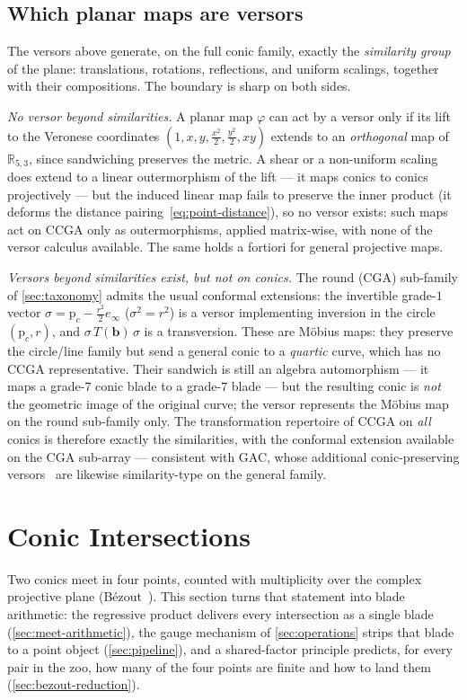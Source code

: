 \documentclass{birkjour}
\theoremstyle{definition}
\theoremstyle{remark}
\newcommand{\einf}{e_\infty}
\begin{document}
\subsection{Which planar maps are versors}
\label{sec:versor-group}
The versors above generate, on the full conic family, exactly the
\emph{similarity group} of the plane: translations, rotations, reflections,
and uniform scalings, together with their compositions. The boundary is
sharp on both sides.

\emph{No versor beyond similarities.} A planar map $\varphi$ can act by a
versor only if its lift to the Veronese coordinates
$(1,x,y,\tfrac{x^2}2,\tfrac{y^2}2,xy)$ extends to an \emph{orthogonal} map of
$\mathbb{R}_{5,3}$, since sandwiching preserves the metric. A shear or a
non-uniform scaling does extend to a linear outermorphism of the lift --- it
maps conics to conics projectively --- but the induced linear map fails to
preserve the inner product (it deforms the distance
pairing~\eqref{eq:point-distance}), so no versor exists: such maps act on
CCGA only as outermorphisms, applied matrix-wise, with none of the versor
calculus available. The same holds a fortiori for general projective maps.

\emph{Versors beyond similarities exist, but not on conics.} The round
(CGA) sub-family of \cref{sec:taxonomy} admits the usual conformal
extensions: the invertible grade-$1$ vector
$\sigma = \mathrm{p}_c - \tfrac{r^2}{2}\einf$ ($\sigma^2=r^2$) is a versor
implementing inversion in the circle $(\mathrm{p}_c, r)$, and
$\sigma\,T(\mathbf{b})\,\sigma$ is a transversion. These are M\"obius maps:
they preserve the circle/line family but send a general conic to a
\emph{quartic} curve, which has no CCGA representative. Their sandwich is
still an algebra automorphism --- it maps a grade-$7$ conic blade to a
grade-$7$ blade --- but the resulting conic is \emph{not} the geometric image
of the original curve; the versor represents the M\"obius map on the round
sub-family only. The transformation repertoire of CCGA on \emph{all} conics
is therefore exactly the similarities, with the conformal extension available
on the CGA sub-array --- consistent with GAC, whose additional
conic-preserving versors~\cite{hrdina_geometric_2018} are likewise
similarity-type on the general family.

\section{Conic Intersections}
\label{sec:intersections}
Two conics meet in four points, counted with multiplicity over the complex
projective plane (B\'ezout~\cite{fulton_algebraic_1989}). This section turns
that statement into blade arithmetic: the regressive product delivers every
intersection as a single blade (\cref{sec:meet-arithmetic}), the gauge
mechanism of \cref{sec:operations} strips that blade to a point object
(\cref{sec:pipeline}), and a shared-factor principle predicts, for every pair
in the zoo, how many of the four points are finite and how to land them
(\cref{sec:bezout-reduction}).
\end{document}

